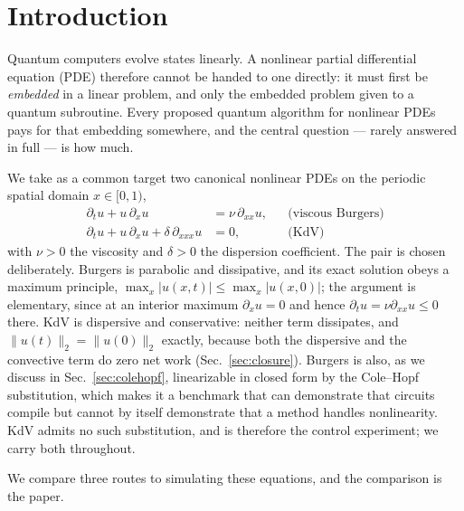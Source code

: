 \documentclass[aps,prx,twocolumn,notitlepage,superscriptaddress,floatfix,10pt]{revtex4-2}
\newcommand{\norm}[1]{\lVert #1 \rVert}
\begin{document}
\section{Introduction}
\label{sec:intro}

Quantum computers evolve states linearly. A nonlinear partial differential equation (PDE) therefore
cannot be handed to one directly: it must first be \emph{embedded} in a linear problem, and only the
embedded problem given to a quantum subroutine. Every proposed quantum algorithm for nonlinear PDEs
pays for that embedding somewhere, and the central question --- rarely answered in full --- is how much.

We take as a common target two canonical nonlinear PDEs on the periodic spatial domain $x\in[0,1)$,
\begin{align}
\partial_t u + u\,\partial_x u &= \nu\,\partial_{xx}u, &&\text{(viscous Burgers)}\label{eq:burgers}\\
\partial_t u + u\,\partial_x u + \delta\,\partial_{xxx}u &= 0, &&\text{(KdV)}\label{eq:kdv}
\end{align}
with $\nu>0$ the viscosity and $\delta>0$ the dispersion coefficient. The pair is chosen
deliberately. Burgers is parabolic and dissipative, and its exact solution obeys a maximum principle,
$\max_x|u(x,t)|\le\max_x|u(x,0)|$; the argument is elementary, since at an interior maximum
$\partial_xu=0$ and hence $\partial_tu=\nu\partial_{xx}u\le0$ there. KdV is dispersive and
conservative: neither term dissipates, and $\norm{u(t)}_2=\norm{u(0)}_2$ exactly, because both the
dispersive and the convective term do zero net work (Sec.~\ref{sec:closure}). Burgers is also, as we
discuss in Sec.~\ref{sec:colehopf}, linearizable in closed form by the Cole--Hopf substitution, which
makes it a benchmark that can demonstrate that circuits compile but cannot by itself demonstrate that
a method handles nonlinearity. KdV admits no such substitution, and is therefore the control
experiment; we carry both throughout.

We compare three routes to simulating these equations, and the comparison is the paper.
\end{document}
